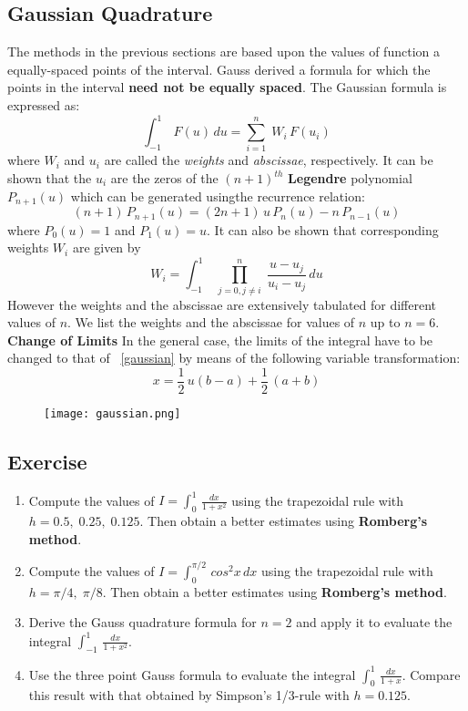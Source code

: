 \documentclass[aima203_lecturenotes_ku.tex]{subfiles}
\begin{document}
\subsection{Gaussian Quadrature}
The methods in the previous sections are based upon the values of function a equally-spaced points of the interval. Gauss derived a formula for which the points in the interval \textbf{need not be equally spaced}.
The Gaussian formula is expressed as:
\begin{equation}
  \label{gaussian}
\int_{-1}^{1} \, F(u)\, du = \sum_{i=1}^n \; W_i\, F(u_i)
\end{equation}
where $W_i$ and $u_i$ are called the \textit{weights} and \textit{abscissae}, respectively. It can be shown that the $u_i$ are the zeros of the $(n+1)^{th}$ \textbf{Legendre} polynomial $P_{n+1}(u)$ which can be generated usingthe recurrence relation:
\begin{equation*}
  (n+1)\,P_{n+1}(u) = (2n+1)\,u\,P_{n}(u) -n\,P_{n-1}(u)
\end{equation*}
where $P_0(u)=1$ and $P_1(u)=u$. It can also be shown that corresponding weights $W_i$ are given by
\begin{equation*}
  W_i =\int_{-1}^{1}\; \prod_{j=0, j\neq i}^n \; \frac{u-u_j}{u_i - u_j}\, du
\end{equation*}
However the weights and the abscissae are extensively tabulated for different values of $n$. We list the weights and the abscissae for values of $n$ up to $n=6$. \\[1mm]
\textbf{Change of Limits}
In the general case, the limits of the integral have to be changed to that of ~\ref{gaussian} by means of the following variable transformation:
\begin{equation*}
  x = \frac{1}{2} \, u(b-a) + \frac{1}{2}\, (a+b)
\end{equation*}

\begin{figure}[h]
  \centering
\texttt{[image: gaussian.png]}
\end{figure}
\subsection{Exercise}
\begin{enumerate}
 \item Compute the values of $I = \displaystyle \int_0^1 \, \frac{dx}{1+x^2}$ using the trapezoidal rule with $h=0.5, \; 0.25, \; 0.125$. Then obtain a better estimates using \textbf{Romberg's method}.

\item Compute the values of $I = \displaystyle \int_0^{\pi/2} \, cos^2x\, dx$ using the trapezoidal rule with $h= \pi /4, \; \pi/8$. Then obtain a better estimates using \textbf{Romberg's method}.
\item Derive the Gauss quadrature formula for $n=2$ and apply it to evaluate the integral $\displaystyle \int_{-1}^1 \, \frac{dx}{1+x^2}$.

\item Use the three point Gauss formula to evaluate the integral $\displaystyle \int_0^1 \, \frac{dx}{1+x}$. Compare this result with that obtained by Simpson's 1/3-rule with $h=0.125$.
\end{enumerate}
\end{document}
